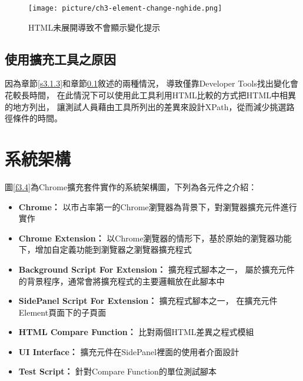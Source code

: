 \begin{figure}[H]
    \centering
    \texttt{[image: picture/ch3-element-change-nghide.png]}
    \caption{HTML未展開導致不會顯示變化提示}
    \label{f3.3}
\end{figure}

\subsection{使用擴充工具之原因}\label{s3.1.4}
因為章節\ref{s3.1.3}和章節\ref{s3.1.4}敘述的兩種情況，
導致僅靠Developer Tools找出變化會花較長時間，
在此情況下可以使用此工具利用HTML比較的方式把HTML中相異的地方列出，
讓測試人員藉由工具所列出的差異來設計XPath，從而減少挑選路徑條件的時間。

\section{系統架構}\label{s3.2}
圖\ref{f3.4}為Chrome擴充套件實作的系統架構圖，下列為各元件之介紹：

\begin{itemize}
\item\textbf{Chrome：}
以市占率第一的Chrome瀏覽器為背景下，對瀏覽器擴充元件進行實作

\item\textbf{Chrome Extension： }
以Chrome瀏覽器的情形下，基於原始的瀏覽器功能下，增加自定義功能到瀏覽器之瀏覽器擴充程式

\item\textbf{Background Script For Extension： }
擴充程式腳本之一， 屬於擴充元件的背景程序，通常會將擴充程式的主要邏輯放在此腳本中

\item\textbf{SidePanel Script For Extension： }
擴充程式腳本之一， 在擴充元件Element頁面下的子頁面

\item\textbf{HTML Compare Function： }
比對兩個HTML差異之程式模組

\item\textbf{UI Interface： }
擴充元件在SidePanel裡面的使用者介面設計

\item\textbf{Test Script： }
針對Compare Function的單位測試腳本

\end{itemize}

